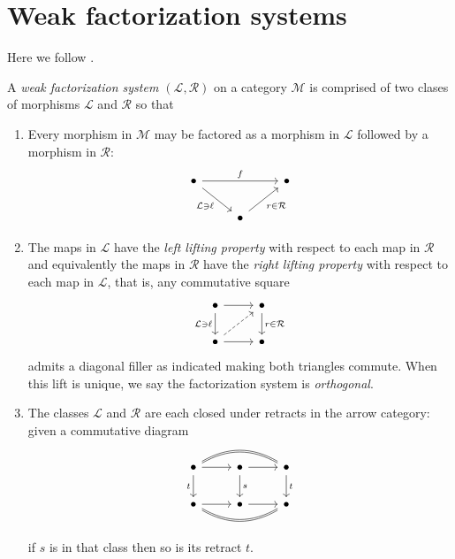 \section{Weak factorization systems}

Here we follow \cite{Riehl}.

\begin{definition}
\label{definition-weak-factorization-system}
A {\it weak factorization system $(\mathcal{L},\mathcal{R})$} on a category 
$\mathcal{M}$ is comprised of two clases of morphisms $\mathcal{L}$ 
and $\mathcal{R}$ so that

\begin{enumerate}
\item Every morphism in $\mathcal{M}$ may be factored as a morphism in $\mathcal{L}$ followed by a morphism in $\mathcal{R}$:
$$\begin{tikzcd}
\bullet\arrow[rr,"f"]\arrow[rd,"\mathcal{L}\ni\ell",swap]&&\bullet\\
&\bullet\arrow[ru,"r\in\mathcal{R}",swap]
\end{tikzcd}$$

\item The maps in $\mathcal{L}$ have the {\it left lifting property} with respect to each map in $\mathcal{R}$ and equivalently the maps in $\mathcal{R}$ have the {\it right lifting property} with respect to each map in $\mathcal{L}$, that is, any commutative square
$$\begin{tikzcd}
\bullet\arrow[d,"\mathcal{L}\ni\ell",swap]\arrow[r]&\bullet\arrow[d,"r\in\mathcal{R}"]\\
\bullet\arrow[ur,dashed]\arrow[r]&\bullet
\end{tikzcd}$$
admits a diagonal filler as indicated making both triangles commute. 
When this lift is unique, 
we say the factorization system is {\it orthogonal}.

\item The classes $\mathcal{L}$ and $\mathcal{R}$ are each closed under 
retracts in the arrow category: 
given a commutative diagram
$$\begin{tikzcd}
\bullet\arrow[r]\arrow[d,"t",swap]\arrow[rr,bend left,no head,shift left=.3]\arrow[rr,bend left,no head,shift right=.3]&\bullet\arrow[r]\arrow[d,"s"]&\bullet\arrow[d,"t"]\\
\bullet\arrow[r]\arrow[rr,bend right,no head, shift right=.3]\arrow[rr,bend right,no head, shift left=.3]&\bullet\arrow[r]&\bullet
\end{tikzcd}$$

\noindent
if $s$ is in that class then so is its retract $t$.
\end{enumerate}
\end{definition}

